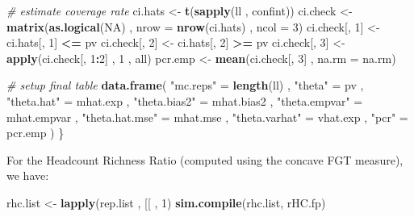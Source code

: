 \documentclass[
]{book}
\newenvironment{Shaded}{\begin{snugshade}}{\end{snugshade}}
\newcommand{\AttributeTok}[1]{\textcolor[rgb]{0.13,0.29,0.53}{#1}}
\newcommand{\CommentTok}[1]{\textcolor[rgb]{0.56,0.35,0.01}{\textit{#1}}}
\newcommand{\ConstantTok}[1]{\textcolor[rgb]{0.56,0.35,0.01}{#1}}
\newcommand{\DecValTok}[1]{\textcolor[rgb]{0.00,0.00,0.81}{#1}}
\newcommand{\FunctionTok}[1]{\textcolor[rgb]{0.13,0.29,0.53}{\textbf{#1}}}
\newcommand{\NormalTok}[1]{#1}
\newcommand{\OtherTok}[1]{\textcolor[rgb]{0.56,0.35,0.01}{#1}}
\newcommand{\SpecialCharTok}[1]{\textcolor[rgb]{0.81,0.36,0.00}{\textbf{#1}}}
\newcommand{\StringTok}[1]{\textcolor[rgb]{0.31,0.60,0.02}{#1}}
\begin{document}
\begin{Shaded}
\begin{Highlighting}[]
  \CommentTok{\# estimate coverage rate}
\NormalTok{  ci.hats }\OtherTok{\textless{}{-}} \FunctionTok{t}\NormalTok{(}\FunctionTok{sapply}\NormalTok{(ll , confint))}
\NormalTok{  ci.check }\OtherTok{\textless{}{-}}
    \FunctionTok{matrix}\NormalTok{(}\FunctionTok{as.logical}\NormalTok{(}\ConstantTok{NA}\NormalTok{) , }\AttributeTok{nrow =} \FunctionTok{nrow}\NormalTok{(ci.hats) , }\AttributeTok{ncol =} \DecValTok{3}\NormalTok{)}
\NormalTok{  ci.check[, }\DecValTok{1}\NormalTok{] }\OtherTok{\textless{}{-}}\NormalTok{ ci.hats[, }\DecValTok{1}\NormalTok{] }\SpecialCharTok{\textless{}=}\NormalTok{ pv}
\NormalTok{  ci.check[, }\DecValTok{2}\NormalTok{] }\OtherTok{\textless{}{-}}\NormalTok{ ci.hats[, }\DecValTok{2}\NormalTok{] }\SpecialCharTok{\textgreater{}=}\NormalTok{ pv}
\NormalTok{  ci.check[, }\DecValTok{3}\NormalTok{] }\OtherTok{\textless{}{-}} \FunctionTok{apply}\NormalTok{(ci.check[, }\DecValTok{1}\SpecialCharTok{:}\DecValTok{2}\NormalTok{] , }\DecValTok{1}\NormalTok{ , all)}
\NormalTok{  pcr.emp }\OtherTok{\textless{}{-}} \FunctionTok{mean}\NormalTok{(ci.check[, }\DecValTok{3}\NormalTok{] , }\AttributeTok{na.rm =}\NormalTok{ na.rm)}
  
  \CommentTok{\# setup final table}
  \FunctionTok{data.frame}\NormalTok{(}
    \StringTok{"mc.reps"} \OtherTok{=} \FunctionTok{length}\NormalTok{(ll) ,}
    \StringTok{"theta"} \OtherTok{=}\NormalTok{ pv ,}
    \StringTok{"theta.hat"} \OtherTok{=}\NormalTok{ mhat.exp ,}
    \StringTok{"theta.bias2"} \OtherTok{=}\NormalTok{ mhat.bias2 ,}
    \StringTok{"theta.empvar"} \OtherTok{=}\NormalTok{ mhat.empvar ,}
    \StringTok{"theta.hat.mse"} \OtherTok{=}\NormalTok{ mhat.mse ,}
    \StringTok{"theta.varhat"} \OtherTok{=}\NormalTok{ vhat.exp ,}
    \StringTok{"pcr"} \OtherTok{=}\NormalTok{ pcr.emp}
\NormalTok{  )}
\NormalTok{\}}
\end{Highlighting}
\end{Shaded}

For the Headcount Richness Ratio (computed using the concave FGT measure), we have:

\begin{Shaded}
\begin{Highlighting}[]
\NormalTok{rhc.list }\OtherTok{\textless{}{-}} \FunctionTok{lapply}\NormalTok{(rep.list , }\StringTok{\textasciigrave{}}\AttributeTok{[[}\StringTok{\textasciigrave{}}\NormalTok{ , }\DecValTok{1}\NormalTok{)}
\FunctionTok{sim.compile}\NormalTok{(rhc.list, rHC.fp)}
\end{Highlighting}
\end{Shaded}
\end{document}
